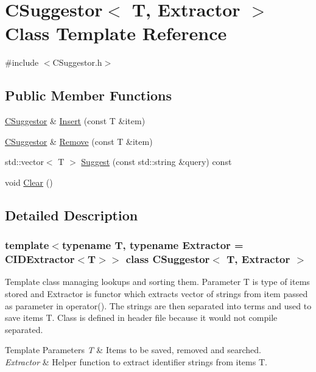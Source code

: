 \hypertarget{class_c_suggestor}{}\section{C\+Suggestor$<$ T, Extractor $>$ Class Template Reference}
\label{class_c_suggestor}


{\ttfamily \#include $<$C\+Suggestor.\+h$>$}

\subsection*{Public Member Functions}
\begin{DoxyCompactItemize}
\item 
\mbox{\hyperlink{class_c_suggestor}{C\+Suggestor}} \& \mbox{\hyperlink{class_c_suggestor_a7dcad2589a3752d147b20c5fc208a655}{Insert}} (const T \&item)
\item 
\mbox{\hyperlink{class_c_suggestor}{C\+Suggestor}} \& \mbox{\hyperlink{class_c_suggestor_a2ec0c6c48be4916eae4b939f23759a53}{Remove}} (const T \&item)
\item 
std\+::vector$<$ T $>$ \mbox{\hyperlink{class_c_suggestor_acc8fed68baf0287a5d4b8204dfc7f392}{Suggest}} (const std\+::string \&query) const
\item 
void \mbox{\hyperlink{class_c_suggestor_aed01dde97e7f7e316e79b0b05a238ac3}{Clear}} ()
\end{DoxyCompactItemize}


\subsection{Detailed Description}
\subsubsection*{template$<$typename T, typename Extractor = C\+I\+D\+Extractor$<$\+T$>$$>$\newline
class C\+Suggestor$<$ T, Extractor $>$}

Template class managing lookups and sorting them. Parameter T is type of items stored and Extractor is functor which extracts vector of strings from item passed as parameter in operator(). The strings are then separated into terms and used to save items T. Class is defined in header file because it would not compile separated. 
\begin{DoxyTemplParams}{Template Parameters}
{\em T} & Items to be saved, removed and searched. \\
\hline
{\em Extractor} & Helper function to extract identifier strings from items T. \\
\hline
\end{DoxyTemplParams}


